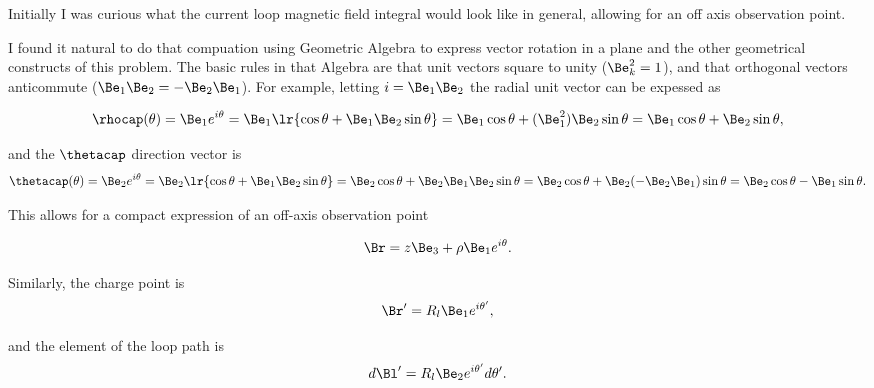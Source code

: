 %
%

Initially I was curious what the current loop magnetic field integral would look like in general, allowing for an off axis observation point.

I found it natural to do that compuation using Geometric Algebra to express vector rotation in a plane and the other geometrical constructs of this problem.  The basic rules in that Algebra are that unit vectors square to unity (\(\Be_k^2 = 1 \)), and that orthogonal vectors anticommute (\( \Be_1 \Be_2 = -\Be_2 \Be_1 \)).  For example, letting \( i = \Be_1 \Be_2 \) the radial unit vector can be expessed as

\begin{dmath}\label{eqn:emtProblemSet3Problem2:160}
\rhocap(\theta)
=
\Be_1 e^{i \theta}
= \Be_1 \lr{ \cos\theta + \Be_1 \Be_2 \sin\theta } 
= \Be_1 \cos\theta + (\Be_1^2) \Be_2 \sin\theta
= \Be_1 \cos\theta + \Be_2 \sin\theta,
\end{dmath}

and the \( \thetacap \) direction vector is
\begin{dmath}\label{eqn:emtProblemSet3Appendix:240}
\thetacap(\theta)
=
\Be_2 e^{i \theta}
= \Be_2 \lr{ \cos\theta + \Be_1 \Be_2 \sin\theta } 
= \Be_2 \cos\theta + \Be_2 \Be_1 \Be_2 \sin\theta
= \Be_2 \cos\theta + \Be_2 (-\Be_2 \Be_1) \sin\theta
= \Be_2 \cos\theta - \Be_1 \sin\theta.
\end{dmath}

This allows for a compact expression of an off-axis observation point

\begin{dmath}\label{eqn:emtProblemSet3Problem2:60}
\Br = z \Be_3 + \rho \Be_1 e^{i\theta}.
\end{dmath}

Similarly, the charge point is
\begin{dmath}\label{eqn:emtProblemSet3Problem2:80}
\Br' = R_l \Be_1 e^{i \theta'},
\end{dmath}

and the element of the loop path is
\begin{dmath}\label{eqn:emtProblemSet3Problem2:100}
d\Bl' = R_l \Be_2 e^{i\theta'} d\theta'.
\end{dmath}

